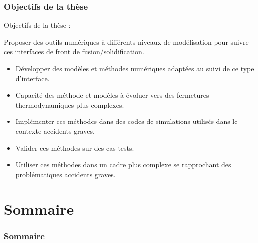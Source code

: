 \documentclass{beamer}
\begin{document}
\begin{frame}
    \frametitle{Objectifs de la thèse}
    \normalsize
    

        	\begin{ceaalertblock}{Objectifs de la thèse :}
        	
        	Proposer des outils numériques à différents niveaux de modélisation pour suivre ces interfaces de front de fusion/solidification.
        	\begin{itemize}
        		\item Développer des modèles et méthodes numériques adaptées au suivi de ce type d'interface. 
        		\item Capacité des méthode et modèles à évoluer vers des fermetures thermodynamiques plus complexes.
        		\item Implémenter ces méthodes dans des codes de simulations utilisés dans le contexte accidents graves.
        		\item Valider ces méthodes sur des cas tests.
        		\item Utiliser ces méthodes dans un cadre plus complexe se rapprochant des problématiques accidents graves. 
        	\end{itemize}
        	\end{ceaalertblock}
\end{frame}
\section*{Sommaire}
\begin{frame}
\frametitle{Sommaire}
\footnotesize
  \tableofcontents
\end{frame}
\end{document}
